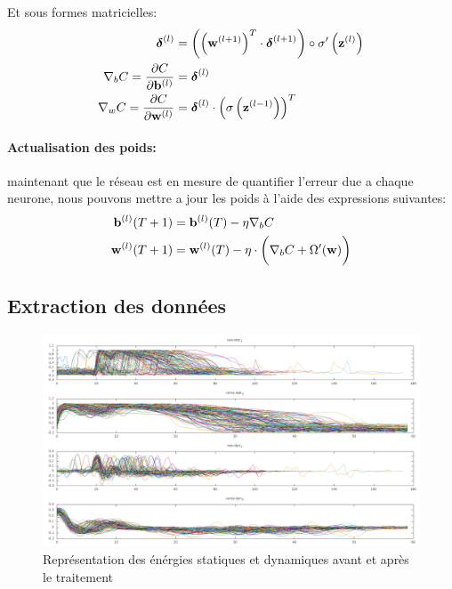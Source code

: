 \documentclass[11pt]{article}
\begin{document}
Et sous formes matricielles:
\begin{equation}
	\begin{aligned}
		\boldsymbol \delta^{(l)} &= \left(\left({\bf w}^{(l+1)} \right)^{T}
		\cdot \boldsymbol \delta^{(l+1)} \right)
		\circ \sigma'\left( {\bf z}^{(l)}\right) \\
		\nabla_bC = \frac{\partial C}{\partial {\bf b}^{(l)}} &=
		\boldsymbol\delta^{(l)}  \\
		\nabla_wC = \frac{\partial C}{\partial {\bf w}^{(l)}} &=
		\boldsymbol\delta^{(l)} \cdot \left(\sigma\left({\bf z}^{(l-1)}\right)\right)^{T}\\
	\end{aligned}
\end{equation}

\paragraph{Actualisation des poids:} maintenant que le r\'eseau est en mesure de
quantifier l'erreur due a chaque neurone, nous pouvons mettre a jour les poids
\`a l'aide des expressions suivantes:
\begin{equation}
	\begin{aligned}
		{\bf b}^{(l)}(T+1) &= {\bf b}^{(l)}(T) - \eta \nabla_bC \\
		{\bf w}^{(l)}(T+1) &= {\bf w}^{(l)}(T) - \eta \cdot \bigg( \nabla_bC + \Omega'({\bf w})\bigg)\\
	\end{aligned}
\end{equation}



\subsection{Extraction des donn\'ees}

\begin{figure}[h]
	\centering
	\includegraphics[scale=.3]{img/preprocessing.png}
	\caption{Repr\'esentation des \'en\'ergies statiques et dynamiques avant et
	apr\`es le traitement}
\end{figure}
\end{document}
